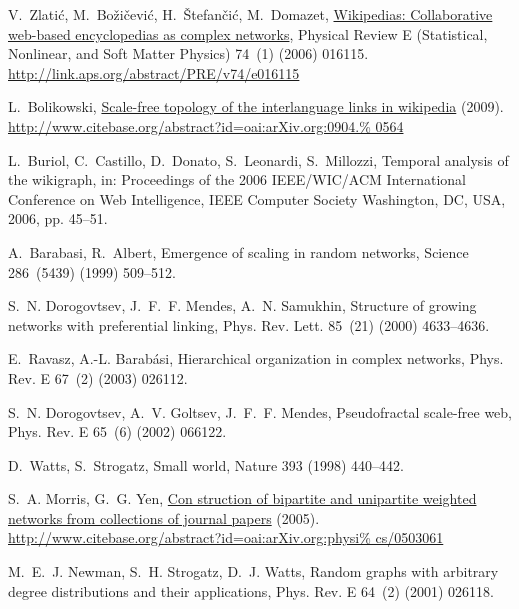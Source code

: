 \documentclass{elsarticle}
\begin{document}
\begin{thebibliography}{10}
V.~Zlati\'{c}, M.~Bo\v{z}i\v{c}evi\'{c}, H.~\v{S}tefan\v{c}i\'{c}, M.~Domazet,
  \href{http://link.aps.org/abstract/PRE/v74/e016115}{Wikipedias: Collaborative
  web-based encyclopedias as complex networks}, Physical Review E (Statistical,
  Nonlinear, and Soft Matter Physics) 74~(1) (2006) 016115.
\newline\urlprefix\url{http://link.aps.org/abstract/PRE/v74/e016115}

L.~Bolikowski,
  \href{http://www.citebase.org/abstract?id=oai:arXiv.org:0904.0564}{Scale-free
  topology of the interlanguage links in wikipedia} (2009).
\newline\urlprefix\url{http://www.citebase.org/abstract?id=oai:arXiv.org:0904.%
0564}

L.~Buriol, C.~Castillo, D.~Donato, S.~Leonardi, S.~Millozzi, {Temporal analysis
  of the wikigraph}, in: Proceedings of the 2006 IEEE/WIC/ACM International
  Conference on Web Intelligence, IEEE Computer Society Washington, DC, USA,
  2006, pp. 45--51.

A.~Barabasi, R.~Albert, {Emergence of scaling in random networks}, Science
  286~(5439) (1999) 509--512.

S.~N. Dorogovtsev, J.~F.~F. Mendes, A.~N. Samukhin, Structure of growing
  networks with preferential linking, Phys. Rev. Lett. 85~(21) (2000)
  4633--4636.

 

E.~Ravasz, A.-L. Barab\'asi, Hierarchical organization in complex networks,
  Phys. Rev. E 67~(2) (2003) 026112.



S.~N. Dorogovtsev, A.~V. Goltsev, J.~F.~F. Mendes, Pseudofractal scale-free
  web, Phys. Rev. E 65~(6) (2002) 066122.

  

D.~Watts, S.~Strogatz, {Small world}, Nature 393 (1998) 440--442.

S.~A. Morris, G.~G. Yen,
  \href{http://www.citebase.org/abstract?id=oai:arXiv.org:physics/0503061}{Con%
struction of bipartite and unipartite weighted 
networks from collections of
  journal papers} (2005).
\newline\urlprefix\url{http://www.citebase.org/abstract?id=oai:arXiv.org:physi%
cs/0503061}

M.~E.~J. Newman, S.~H. Strogatz, D.~J. Watts, Random graphs with arbitrary
  degree distributions and their applications, Phys. Rev. E 64~(2) (2001)
  026118.

 

\end{thebibliography}
\end{document}
